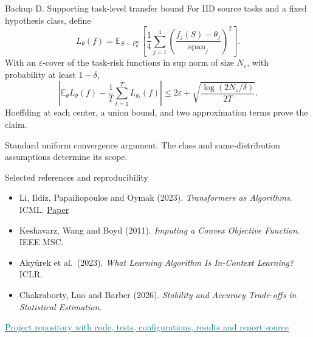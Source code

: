 \documentclass[aspectratio=169,11pt]{beamer}
\newcommand{\source}[1]{\par\vfill{\color{muted}\tiny #1}}
\begin{document}
\begin{frame}[noframenumbering]{Backup D. Supporting task-level transfer bound}
\small
For IID source tasks and a fixed hypothesis class, define
\[
L_\theta(f)=\mathbb E_{S\sim P_\theta^m}
  \left[\frac14\sum_{j=1}^{4}
    \left(\frac{f_j(S)-\theta_j}{\mathrm{span}_j}\right)^2\right].
\]
With an \(\varepsilon\)-cover of the task-risk functions in sup norm of
size \(N_\varepsilon\), with probability at least \(1-\delta\),
\[
\left|\mathbb E_\theta L_\theta(f)-\frac1T\sum_{t=1}^{T}L_{\theta_t}(f)\right|
\le2\varepsilon+
\sqrt{\frac{\log(2N_\varepsilon/\delta)}{2T}}.
\]
Hoeffding at each center, a union bound, and two approximation terms prove the claim.
\source{Standard uniform convergence argument. The class and same-distribution assumptions determine its scope.}
\end{frame}

\begin{frame}[noframenumbering]{Selected references and reproducibility}
\footnotesize
\begin{itemize}
\setlength{\itemsep}{3mm}
\item Li, Ildiz, Papailiopoulos and Oymak (2023).
\emph{Transformers as Algorithms}. ICML.
\href{https://proceedings.mlr.press/v202/li23l.html}{Paper}
\item Keshavarz, Wang and Boyd (2011).
\emph{Imputing a Convex Objective Function}. IEEE MSC.
\item Aky\"urek et al.\ (2023).
\emph{What Learning Algorithm Is In-Context Learning?} ICLR.
\item Chakraborty, Luo and Barber (2026).
\emph{Stability and Accuracy Trade-offs in Statistical Estimation}.
\end{itemize}
\vspace{4mm}
\href{https://github.com/feizhanguwaterloo/Stability-and-Information-Sensitivity-in-Transformer-In-Context-Inverse-Learning}
{\textcolor{teal}{Project repository with code, tests, configurations, results and report source}}
\end{frame}
\end{document}
